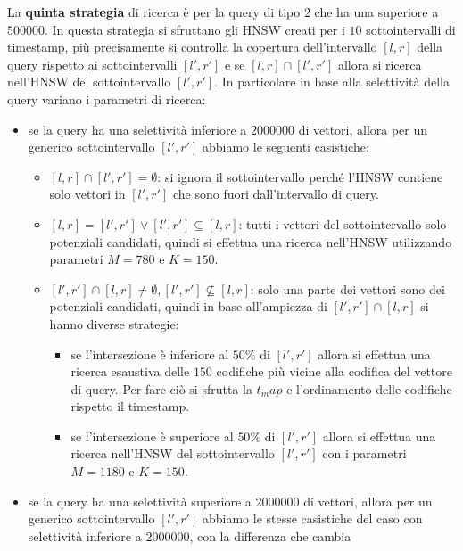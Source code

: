 La \textbf{quinta strategia} di ricerca è per la query di tipo $2$ che ha una 
superiore a $500000$. In questa strategia si sfruttano gli HNSW creati per i $10$
sottointervalli di timestamp, più precisamente si controlla la copertura dell'intervallo 
$[l,r]$ della query rispetto ai sottointervalli $[l',r']$ e se $[l,r]\cap [l',r']$ 
allora si ricerca nell'HNSW del sottointervallo $[l',r']$. 
In particolare in base alla selettività della query variano i parametri di ricerca:
\begin{itemize}
    \item se la query ha una selettività inferiore a $2000000$ di vettori, allora 
    per un generico sottointervallo $[l',r']$ abbiamo le seguenti casistiche:
    \begin{itemize}
        \item $[l,r]\cap [l',r'] = \emptyset$: si ignora il sottointervallo perché 
        l'HNSW contiene solo vettori in $[l',r']$ che sono fuori dall'intervallo 
        di query.
        \item $[l,r] = [l',r'] \lor  [l',r'] \subseteq [l,r]$: tutti i vettori 
        del sottointervallo solo potenziali candidati, quindi si effettua una ricerca nell'HNSW
        utilizzando parametri $M=780$ e $K=150$.
        \item $[l',r'] \cap [l,r] \ne \emptyset, [l',r'] \not \subseteq [l,r]$: 
        solo una parte dei vettori sono dei potenziali candidati, quindi in base 
        all'ampiezza di $[l',r'] \cap [l,r]$ si hanno diverse strategie:
        \begin{itemize}
            \item se l'intersezione è inferiore al $50\%$ di $[l',r']$ allora si effettua una 
            ricerca esaustiva delle $150$ codifiche più vicine alla codifica del 
            vettore di query. Per fare ciò si sfrutta la $t_map$ e 
            l'ordinamento delle codifiche rispetto il timestamp.
            \item se l'intersezione è superiore al $50\%$ di $[l',r']$ allora si effettua una 
            ricerca nell'HNSW del sottointervallo $[l',r']$ con i parametri $M=1180$ e $K=150$.
        \end{itemize}
    \end{itemize}
    \item se la query ha una selettività superiore a $2000000$ di vettori, allora 
    per un generico sottointervallo $[l',r']$ abbiamo le stesse casistiche 
    del caso con selettività inferiore a $2000000$, con la differenza che cambia

\end{itemize}
